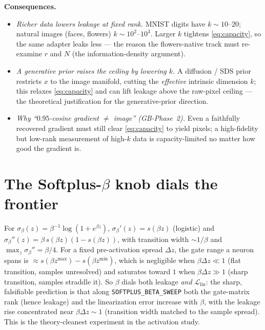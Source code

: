 \documentclass[11pt]{article}
\begin{document}
\noindent\textbf{Consequences.}
\begin{itemize}
  \item \emph{Richer data lowers leakage at fixed rank.} MNIST digits have $k\sim10$--$20$; natural
  images (faces, flowers) $k\sim10^2$--$10^3$. Larger $k$ tightens \eqref{eq:capacity}, so the same
  adapter leaks less --- the reason the flowers-native track must re-examine $r$ and $N$
  (the information-density argument).
  \item \emph{A generative prior raises the ceiling by lowering $k$.} A diffusion / SDS prior restricts
  $x$ to the image manifold, cutting the \emph{effective} intrinsic dimension $k$; this relaxes
  \eqref{eq:capacity} and can lift leakage above the raw-pixel ceiling --- the theoretical justification
  for the generative-prior direction.
  \item \emph{Why ``$0.95$-cosine gradient $\ne$ image'' (GB-Phase~2).} Even a faithfully recovered
  gradient must still clear \eqref{eq:capacity} to yield pixels; a high-fidelity but low-rank measurement
  of high-$k$ data is capacity-limited no matter how good the gradient is.
\end{itemize}

\section{The Softplus-$\beta$ knob dials the frontier}
For $\sigma_\beta(z)=\beta^{-1}\log(1+e^{\beta z})$, $\sigma_\beta'(z)=s(\beta z)$ (logistic) and
$\sigma_\beta''(z)=\beta\,s(\beta z)(1-s(\beta z))$, with transition width $\sim 1/\beta$ and
$\max_z\sigma_\beta''=\beta/4$. For a fixed pre-activation spread $\Delta z$, the gate range a neuron
spans is $\approx s(\beta z^{\max})-s(\beta z^{\min})$, which is negligible when $\beta\Delta z\ll1$
(flat transition, samples unresolved) and saturates toward $1$ when $\beta\Delta z\gg1$ (sharp
transition, samples straddle it). So $\beta$ dials both leakage \emph{and} $\mathcal L_{\mathrm{lin}}$:
the sharp, falsifiable prediction is that along \texttt{SOFTPLUS\_BETA\_SWEEP} both the gate-matrix rank
(hence leakage) and the linearization error increase with $\beta$, with the leakage rise concentrated
near $\beta\Delta z\sim1$ (transition width matched to the sample spread). This is the theory-cleanest
experiment in the activation study.
\end{document}
